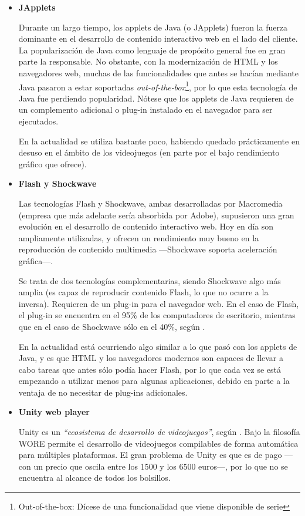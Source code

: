 \begin{itemize}

\item{\bf JApplets}

Durante un largo tiempo, los applets de Java (o JApplets) fueron la fuerza dominante en el desarrollo de contenido interactivo web en el lado del cliente. La popularización de Java como lenguaje de propósito general fue en gran parte la responsable. No obstante, con la modernización de \acs{HTML} y los navegadores web, muchas de las funcionalidades que antes se hacían mediante Java pasaron a estar soportadas {\it out-of-the-box}\footnote{Out-of-the-box: Dícese de una funcionalidad que viene disponible de serie}, por lo que esta tecnología de Java fue perdiendo popularidad. Nótese que los applets de Java requieren de un complemento adicional o plug-in instalado en el navegador para ser ejecutados.

En la actualidad se utiliza bastante poco, habiendo quedado prácticamente en desuso en el ámbito de los videojuegos (en parte por el bajo rendimiento gráfico que ofrece).

\item{\bf Flash y Shockwave}

Las tecnologías Flash y Shockwave, ambas desarrolladas por Macromedia (empresa que más adelante sería absorbida por Adobe), supusieron una gran evolución en el desarrollo de contenido interactivo web. Hoy en día son ampliamente utilizadas, y ofrecen un rendimiento muy bueno en la reproducción de contenido multimedia ---Shockwave soporta aceleración gráfica---.

Se trata de dos tecnologías complementarias, siendo Shockwave algo más amplia (es capaz de reproducir contenido Flash, lo que no ocurre a la inversa). Requieren de un plug-in para el navegador web. En el caso de Flash, el plug-in se encuentra en el 95\% de los computadores de escritorio, mientras que en el caso de Shockwave sólo en el 40\%, según \cite{w3techs}.

En la actualidad está ocurriendo algo similar a lo que pasó con los applets de Java, y es que \acs{HTML} y los navegadores modernos son capaces de llevar a cabo tareas que antes sólo podía hacer Flash, por lo que cada vez se está empezando a utilizar menos para algunas aplicaciones, debido en parte a la ventaja de no necesitar de plug-ins adicionales.

\item{\bf Unity web player}

Unity es un {\it ``ecosistema de desarrollo de videojuegos''}, según \cite{unity}. Bajo la filosofía \acf{WORE} permite el desarrollo de videojuegos compilables de forma automática para múltiples plataformas. El gran problema de Unity es que es de pago ---con un precio que oscila entre los 1500 y los 6500 euros---, por lo que no se encuentra al alcance de todos los bolsillos.


\end{itemize}
